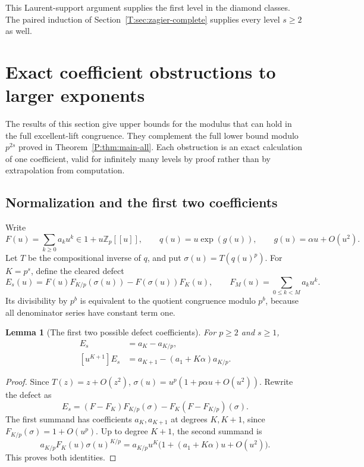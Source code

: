 \documentclass[11pt,a4paper]{article}
\newtheorem{lemma}[theorem]{Lemma}
\theoremstyle{definition}\newtheorem{definition}[theorem]{Definition}
\theoremstyle{remark}\newtheorem{remark}[theorem]{Remark}
\numberwithin{equation}{section}
\begin{document}
This Laurent-support argument supplies the first level in the diamond classes. The paired induction of Section~\ref{T:sec:zagier-complete} supplies every level $s\ge2$ as well.


\section{Exact coefficient obstructions to larger exponents}\label{E:source-main-4}
\label{E:sec:sharpness}

The results of this section give upper bounds for the modulus that can
hold in the full excellent-lift congruence. They complement the full lower bound modulo $p^{2s}$ proved in Theorem~\ref{P:thm:main-all}.  Each obstruction is an exact calculation
of one coefficient, valid for infinitely many levels by proof rather
than by extrapolation from computation.

\subsection{Normalization and the first two coefficients}

Write
\[
 F(u)=\sum_{k\geq0}a_ku^k\in1+u\mathbb Z_p[[u]],\qquad
 q(u)=u\exp(g(u)),\qquad g(u)=\alpha u+O(u^2).
\]
Let $T$ be the compositional inverse of $q$, and put
$\sigma(u)=T(q(u)^p)$.  For $K=p^s$, define the cleared defect
\[
 E_s(u)=F(u)F_{K/p}(\sigma(u))-F(\sigma(u))F_K(u),
 \qquad F_M(u)=\sum_{0\leq k<M}a_ku^k.
\]
Its divisibility by $p^b$ is equivalent to the quotient congruence
modulo $p^b$, because all denominator series have constant term one.

\begin{lemma}[The first two possible defect coefficients]
\label{E:lem:sh-firstjet}
For $p\geq2$ and $s\geq1$,
\begin{align}
 [u^K]E_s&=a_K-a_{K/p},\label{E:eq:sh-first}\\
 [u^{K+1}]E_s&=a_{K+1}-(a_1+K\alpha)a_{K/p}.
 \label{E:eq:sh-second}
\end{align}
\end{lemma}
\begin{proof}
Since $T(z)=z+O(z^2)$,
$\sigma(u)=u^p(1+p\alpha u+O(u^2))$.  Rewrite the defect as
\[
 E_s=(F-F_K)F_{K/p}(\sigma)-F_K(F-F_{K/p})(\sigma).
\]
The first summand has coefficients $a_K,a_{K+1}$ at degrees $K,K+1$,
since $F_{K/p}(\sigma)=1+O(u^p)$.  Up to degree $K+1$, the second
summand is
\[
 a_{K/p}F_K(u)\sigma(u)^{K/p}
 =a_{K/p}u^K\bigl(1+(a_1+K\alpha)u+O(u^2)\bigr).
\]
This proves both identities.
\end{proof}
\end{document}
